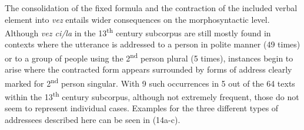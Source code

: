 \documentclass[output=paper]{langscibook}
\begin{document}
\begin{itemize}
\begin{itemize}
\begin{itemize}
\begin{itemize}
\begin{itemize}
\begin{itemize}
\begin{itemize}
\begin{itemize}
\begin{itemize}
\begin{itemize}
\begin{itemize}
\begin{itemize}
The consolidation of the fixed formula and the contraction of the included verbal element into \textit{vez} entails wider consequences on the morphosyntactic level. Although \textit{vez ci/la} in the 13\textsuperscript{th} century subcorpus are still mostly found in contexts where the utterance is addressed to a person in polite manner (49 times) or to a group of people using the 2\textsuperscript{nd} person plural (5 times), instances begin to arise where the contracted form appears surrounded by forms of address clearly marked for 2\textsuperscript{nd} person singular. With 9 such occurrences in 5 out of the 64 texts within the 13\textsuperscript{th} century subcorpus, although not extremely frequent, those do not seem to represent individual cases. Examples for the three different types of addressees described here can be seen in (14a-c). 


\end{itemize}
\end{itemize}
\end{itemize}
\end{itemize}
\end{itemize}
\end{itemize}
\end{itemize}
\end{itemize}
\end{itemize}
\end{itemize}
\end{itemize}
\end{itemize}
\end{document}
